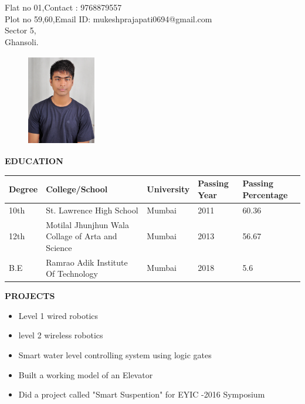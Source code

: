 \documentclass[a4paper]{article}
\begin{document}




\begin{flushleft}
{Flat no 01,\hfill{Contact : 9768879557} \\Plot no 59,60,\hfill{Email ID: mukeshprajapati0694@gmail.com}\\ Sector 5, \\Ghansoli.}
\end{flushleft}


\begin{figure}[h]
\begin{flushright}
\graphicspath{ {images/} }
\includegraphics[width=3cm, height=4cm]{cv_pic}
\end{flushright}
\end{figure}

\begin{flushleft}
\textbf { EDUCATION}
\begin{center}
\begin{tabular}{ | m{2cm} | m{2.5cm}| m{2cm} | m{2.5cm}| m{3cm} | } 
\hline
Degree& College/School & University & Passing Year & Passing Percentage \\ 
\hline
10th  & St. Lawrence High School & Mumbai & 2011 & 60.36 \\ 
\hline
12th & Motilal Jhunjhun Wala Collage of Arta and Science & Mumbai & 2013 & 56.67 \\ 
\hline
B.E & Ramrao Adik Institute Of Technology & Mumbai & 2018 & 5.6 \\

\hline
\end{tabular}
\end{center}
\end{flushleft}


\begin{flushleft}
\textbf {PROJECTS}\\
\begin{itemize}
\item Level 1 wired robotics
\item level 2 wireless robotics
\item Smart water level controlling system using logic gates
\item Built a working model of an Elevator
\item Did a project called "Smart Suspention" for EYIC -2016 Symposium
\end{itemize}
\end{flushleft}
\end{document}
